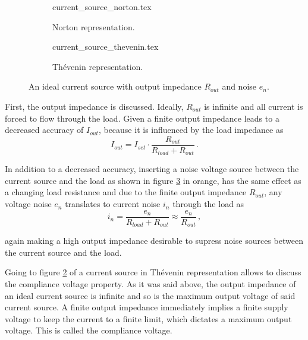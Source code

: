 \begin{figure}[ht]
    \centering
    \begin{subfigure}{0.4\linewidth}
        \centering
        {current_source_norton.tex}
        \caption{Norton representation.}
        \label{fig:ideal_current_source_norton}
    \end{subfigure}
    \begin{subfigure}{0.4\linewidth}
        \centering
        {current_source_thevenin.tex}
        \caption{Thévenin representation.}
        \label{fig:ideal_current_source_thevenin}
    \end{subfigure}
    \caption{An ideal current source with output impedance $R_{out}$ and noise $e_n$.}
    \label{fig:ideal_current_source}
\end{figure}

First, the output impedance is discussed. Ideally, $R_{out}$ is infinite and all current is forced to flow through the load. Given a finite output impedance leads to a decreased accuracy of $I_{out}$, because it is influenced by the load impedance as
\begin{equation}
    I_{out} = I_{set} \cdot \frac{R_{out}}{R_{load} + R_{out}} \, .
\end{equation}

In addition to a decreased accuracy, inserting a noise voltage source between the current source and the load as shown in figure \ref{fig:ideal_current_source} in orange, has the same effect as a changing load resistance and due to the finite output impedance $R_{out}$, any voltage noise $e_n$ translates to current noise $i_n$ through the load as
\begin{equation}
    i_n = \frac{e_n}{R_{load} + R_{out}} \approx \frac{e_n}{R_{out}} \, ,
\end{equation}

again making a high output impedance desirable to supress noise sources between the current source and the load.

Going to figure \ref{fig:ideal_current_source_thevenin} of a current source in Thévenin representation allows to discuss the compliance voltage property. As it was said above, the output impedance of an ideal current source is infinite and so is the maximum output voltage of said current source. A finite output impedance immediately implies a finite supply voltage to keep the current to a finite limit, which dictates a maximum output voltage. This is called the compliance voltage.

